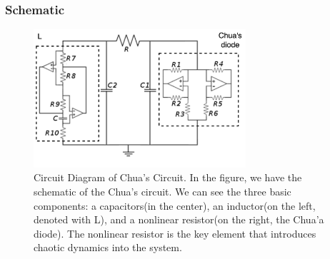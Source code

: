 \documentclass[12pt]{article}
\begin{document}
                \subsubsection{Schematic}
                
                \begin{figure}[h!]
                        \centering
                        \includegraphics[width=0.7\textwidth]{./img/other/circuit_img.png}
                        \caption{Circuit Diagram of Chua's Circuit. In the figure, we have the schematic of the Chua's circuit. We can see the three basic components: a capacitors(in the center), 
                        an inductor(on the left, denoted with L), and a nonlinear resistor(on the right, the Chua'a diode). The nonlinear resistor is the key element that introduces chaotic dynamics into the system.}
                        \label{fig: Circuit Diagram of Chua's Circuit.}
                \end{figure}
\end{document}
